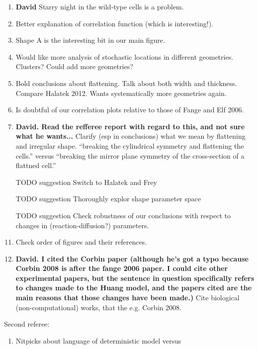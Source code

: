 \documentclass[10pt,letterpaper]{article}
\newcommand{\blue}[1]{{\bf \color{blue} #1}}
\begin{document}
{\begin{enumerate}
    \emph{If you can't make it grow in a .3 micron (rigid) silicon channel,
      then we and you observe it growing in a .25 micron flexible
      channel, it presumably must be able to grow because it deformed
      the channel to larger than .3 microns.}
  \item \blue{David} Starry night in the wild-type cells is a problem.
  \item Better explanation of correlation function (which is
    interesting!).
  \item Shape A is the interesting bit in our main figure.
  \item Would like more analysis of stochastic locations in different
    geometries.  Clusters?  Could add more geometries?
  \item Bold conclusions about flattening.  Talk about both width and
    thickness.  Compare Halatek 2012.  Wants systematically more
    geometries again.
  \item Is doubtful of our correlation plots relative to those of
    Fange and Elf 2006.
  \item \blue{David. Read the refferee report with regard to this, and
    not sure what he wants...} Clarify (esp in conclusions) what we
    mean by flattening and irregular shape.  ``breaking the
    cylindrical symmetry and flattening the cells.'' versus ``breaking
    the mirror plane symmetry of the cross-section of a flattned
    cell.''
  \item[TODO suggestion] Switch to Halatek and Frey
  \item[TODO suggestion] Thoroughly explor shape parameter space
  \item[TODO suggestion] Check robustness of our conclusions with
    respect to changes in (reaction-diffusion?) parameters.
  \item Check order of figures and their references.
  \item \blue{David.  I cited the Corbin paper (although he's got a
    typo because Corbin 2008 is after the fange 2006 paper. I could
    cite other experimental papers, but the sentence in question
    specifically refers to changes made to the Huang model, and the
    papers cited are the main reasons that those changes have been
    made.)} Cite biological (non-computational) works, that the
    e.g. Corbin 2008.
  \end{enumerate}
  Second referee:
  \begin{enumerate}
  \item Nitpicks about language of deterministic model versus

\end{enumerate}}
\end{document}
